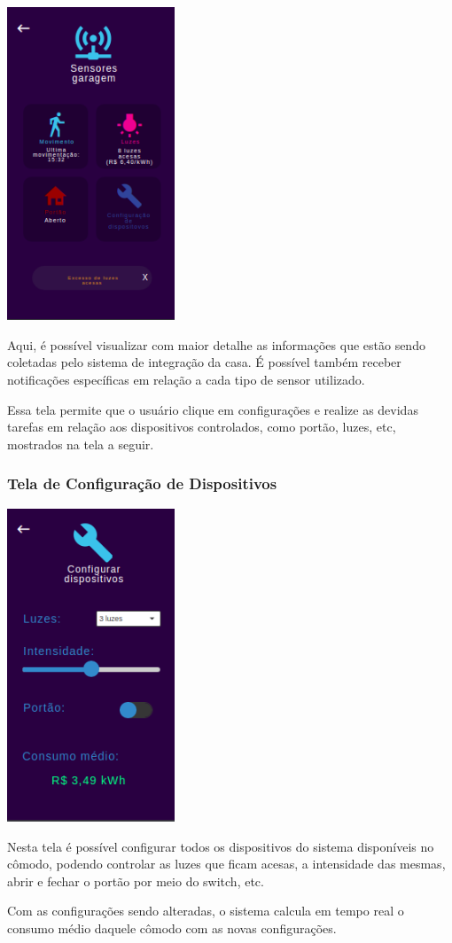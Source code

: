 \begin{center}
\includegraphics[width=5cm]{figuras/4}
\end{center}

\par Aqui, é possível visualizar com maior detalhe as informações que estão sendo coletadas pelo sistema de integração da casa. É possível também receber notificações específicas em relação a cada tipo de sensor utilizado.
\par Essa tela permite que o usuário clique em configurações e realize as devidas tarefas em relação aos dispositivos controlados, como portão, luzes, etc, mostrados na tela a seguir.

\subsubsection{Tela de Configuração de Dispositivos}

\begin{center}
\includegraphics[width=5cm]{figuras/5}
\end{center}

\par Nesta tela é possível configurar todos os dispositivos do sistema disponíveis no cômodo, podendo controlar as luzes que ficam acesas, a intensidade das mesmas, abrir e fechar o portão por meio do switch, etc.
\par Com as configurações sendo alteradas, o sistema calcula em tempo real o consumo médio daquele cômodo com as novas configurações.
